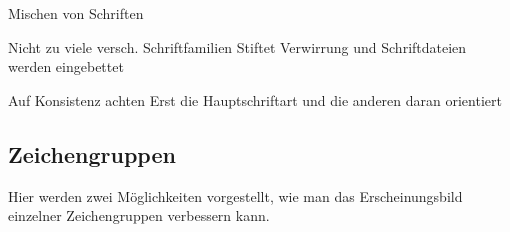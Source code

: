 \begin{frame}{Mischen von Schriften}
  \begin{alertblock}{Nicht zu viele versch. Schriftfamilien}
    Stiftet Verwirrung und Schriftdateien werden eingebettet%
  \end{alertblock}
  \begin{alertblock}{Auf Konsistenz achten}
    Erst die Hauptschriftart und die anderen daran orientiert%
  \end{alertblock}
\end{frame}


\subsection{Zeichengruppen}
\frame{\subsectionpage}
Hier werden zwei Möglichkeiten vorgestellt, wie man das
Erscheinungsbild einzelner Zeichengruppen verbessern kann.


